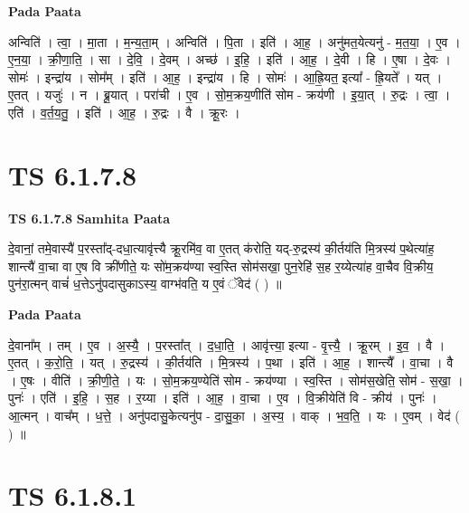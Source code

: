 \documentclass[17pt]{extarticle}
\begin{document}
\textbf{Pada Paata} \newline

अन्विति॑ । त्वा॒ । मा॒ता । म॒न्य॒ता॒म् । अन्विति॑ । पि॒ता । इति॑ । आ॒ह॒ । अनु॑मत॒येत्यनु॑ - म॒त॒या॒ । ए॒व । ए॒न॒या॒ । क्री॒णा॒ति॒ । सा । दे॒वि॒ । दे॒वम् । अच्छ॑ । इ॒हि॒ । इति॑ । आ॒ह॒ । दे॒वी । हि । ए॒षा । दे॒वः । सोमः॑ । इन्द्रा॑य । सोम᳚म् । इति॑ । आ॒ह॒ । इन्द्रा॑य । हि । सोमः॑ । आ॒ह्रि॒यत॒ इत्या᳚ - ह्रि॒यते᳚ । यत् । ए॒तत् । यजुः॑ । न । ब्रू॒यात् । परा॑ची । ए॒व । सो॒म॒क्रय॒णीति॑ सोम - क्रय॑णी । इ॒या॒त् । रु॒द्रः । त्वा॒ । एति॑ । व॒र्त॒य॒तु॒ । इति॑ । आ॒ह॒ । रु॒द्रः । वै । क्रू॒रः ।  \newline





\section{ TS 6.1.7.8 }

\textbf{TS 6.1.7.8 } \newline
\textbf{Samhita Paata} \newline

दे॒वानां॒ तमे॒वास्यै॑ प॒रस्ता᳚द्-दधा॒त्यावृ॑त्त्यै क्रू॒रमि॑व॒ वा ए॒तत् क॑रोति॒ यद्-रु॒द्रस्य॑ की॒र्तय॑ति मि॒त्रस्य॑ प॒थेत्या॑ह॒ शान्त्यै॑ वा॒चा वा ए॒ष वि क्री॑णीते॒ यः सो॑म॒क्रय॑ण्या स्व॒स्ति सोम॑सखा॒ पुन॒रेहि॑ स॒ह र॒य्येत्या॑ह वा॒चैव वि॒क्रीय॒ पुन॑रा॒त्मन् वाचं॑ ध॒त्तेऽनु॑पदासुकाऽस्य॒ वाग्भ॑वति॒ य ए॒वं ॅवेद॑ ( ) ॥ \newline

\textbf{Pada Paata} \newline

दे॒वाना᳚म् । तम् । ए॒व । अ॒स्यै॒ । प॒रस्ता᳚त् । द॒धा॒ति॒ । आवृ॑त्त्या॒ इत्या - वृ॒त्त्यै॒ । क्रू॒रम् । इ॒व॒ । वै । ए॒तत् । क॒रो॒ति॒ । यत् । रु॒द्रस्य॑ । की॒र्तय॑ति । मि॒त्रस्य॑ । प॒था । इति॑ । आ॒ह॒ । शान्त्यै᳚ । वा॒चा । वै । ए॒षः । वीति॑ । क्री॒णी॒ते॒ । यः । सो॒म॒क्रय॒ण्येति॑ सोम - क्रय॑ण्या । स्व॒स्ति । सोम॑स॒खेति॒ सोम॑ - स॒खा॒ । पुनः॑ । एति॑ । इ॒हि॒ । स॒ह । र॒य्या । इति॑ । आ॒ह॒ । वा॒चा । ए॒व । वि॒क्रीयेति॑ वि - क्रीय॑ । पुनः॑ । आ॒त्मन् । वाच᳚म् । ध॒त्ते॒ । अनु॑पदासु॒केत्यनु॑प - दा॒सु॒का॒ । अ॒स्य॒ । वाक् । भ॒व॒ति॒ । यः । ए॒वम् । वेद॑ ( ) ॥  \newline





\section{ TS 6.1.8.1 }
\end{document}
